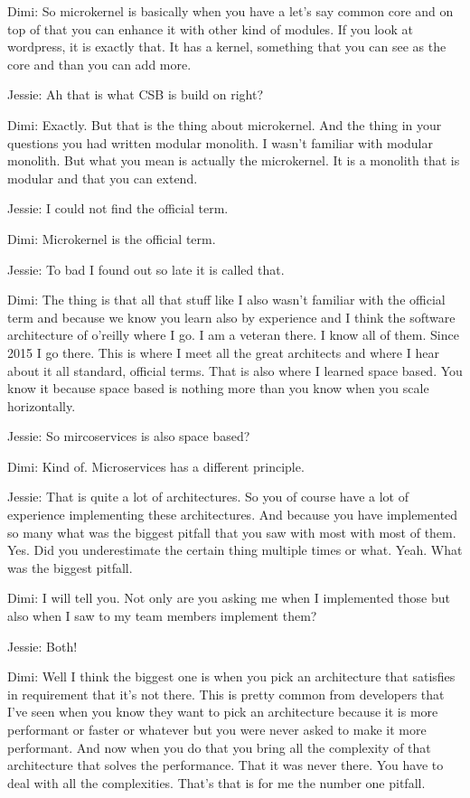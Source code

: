 Dimi: So microkernel is basically when you have a let's say common core and on top of that you can enhance it with other kind of modules. If you look at wordpress, it is exactly that. It has a kernel, something that you can see as the core and than you can add more.

Jessie: Ah that is what CSB is build on right?

Dimi: Exactly. But that is the thing about microkernel. And the thing in your questions you had written modular monolith. I wasn't familiar with modular monolith. But what you mean is actually the microkernel. It is a monolith that is modular and that you can extend.

Jessie: I could not find the official term.

Dimi: Microkernel is the official term.

Jessie: To bad I found out so late it is called that.

Dimi: The thing is that all that stuff like I also wasn't familiar with the official term and because we know you learn also by experience and I think the software architecture of o'reilly where I go. I am a veteran there. I know all of them. Since 2015 I go there. This is where I meet all the great architects and where I hear about it all standard, official terms. That is also where I learned space based. You know it because space based is nothing more than you know when you scale horizontally.

Jessie: So mircoservices is also space based?

Dimi: Kind of. Microservices has a different principle.

Jessie: That is quite a lot of architectures. So you of course have a lot of experience implementing these architectures. And because you have implemented so many what was the biggest pitfall that you saw with most with most of them. Yes. Did you underestimate the certain thing multiple times or what. Yeah. What was the biggest pitfall.

Dimi: I will tell you. Not only are you asking me when I implemented those but also when I saw to my team members implement them?

Jessie: Both!

Dimi: Well I think the biggest one is when you pick an architecture that satisfies in requirement that it's not there. This is pretty common from developers that I've seen when you know they want to pick an architecture because it is more performant or faster or whatever but you were never asked to make it more performant. And now when you do that you bring all the complexity of that architecture that solves the performance. That it was never there. You have to deal with all the complexities. That's that is for me the number one pitfall.

